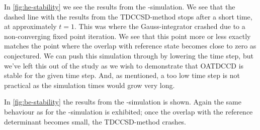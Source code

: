         In \autoref{fig:he-stability} we see the results from the
        -simulation.
        We see that the dashed line with the results from the TDCCSD-method
        stops after a short time, at approximately $t = \num{1}$.
        This was where the Gauss-integrator crashed due to a non-converging
        fixed point iteration.
        We see that this point more or less exactly matches the point where the
        overlap with reference state becomes close to zero as conjectured.
        We can push this simulation through by lowering the time step, but we've
        left this out of the study as we wish to demonstrate that OATDCCD is
        stable for the given time step.
        And, as mentioned, a too low time step is not practical as the
        simulation times would grow very long.

        In \autoref{fig:be-stability} the results from the -simulation is
        shown.
        Again the same behaviour as for the -simulation is exhibited;
        once the overlap with the reference determinant becomes small, the
        TDCCSD-method crashes.

